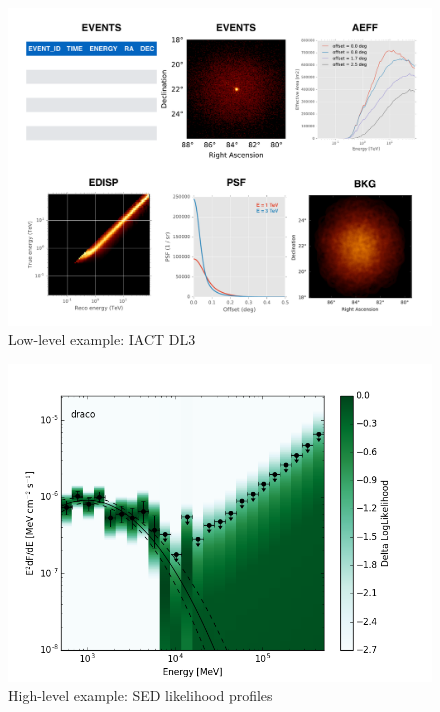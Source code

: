 \begin{figure}[tb]
  \centerline{\includegraphics[width=\textwidth]{figures/iact-dl3}}
  \caption{Low-level example: IACT DL3}
\end{figure}

\begin{figure}[tb]
  \centerline{\includegraphics[width=\textwidth]{figures/llsed_hights}}
  \caption{High-level example: SED likelihood profiles}
\end{figure}


% 
